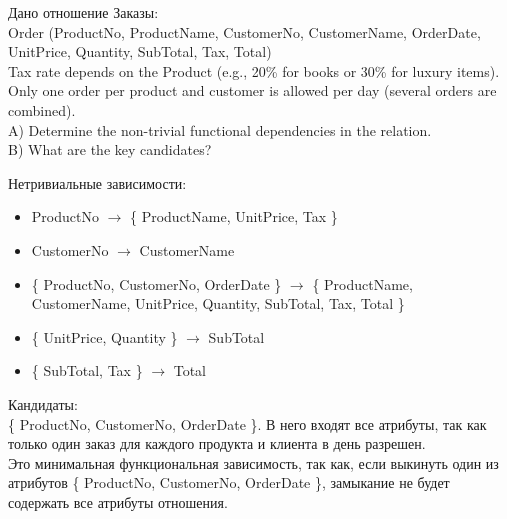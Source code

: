 \begin{problem}
    Дано отношение Заказы: \\
    Order (ProductNo, ProductName, CustomerNo, CustomerName, OrderDate, UnitPrice, Quantity, SubTotal, Tax, Total) \\
    Tax rate depends on the Product (e.g., 20\% for books or 30\% for luxury items).\\
    Only one order per product and customer is allowed per day (several orders are combined). \\
    A) Determine the non-trivial functional dependencies in the relation. \\
    B) What are the key candidates?
\end{problem}
\begin{solution}
    Нетривиальные зависимости:
    \begin{itemize}
        \item ProductNo \(\to\) \{ ProductName, UnitPrice, Tax \}
        \item CustomerNo \(\to\) CustomerName
        \item \{ ProductNo, CustomerNo, OrderDate \} \(\to\) \{ ProductName, CustomerName, UnitPrice, Quantity, SubTotal, Tax, Total \}
        \item \{ UnitPrice, Quantity \} \(\to\) SubTotal
        \item \{ SubTotal, Tax \} \(\to\) Total
    \end{itemize}
    Кандидаты: \\
    \{ ProductNo, CustomerNo, OrderDate \}. В него входят все атрибуты, так как только один заказ для каждого продукта и клиента в день разрешен. \\
    Это минимальная функциональная зависимость, так как, если выкинуть один из атрибутов \{ ProductNo, CustomerNo, OrderDate \}, замыкание не будет содержать все атрибуты отношения.
    
\end{solution}